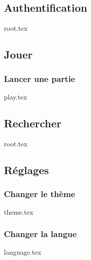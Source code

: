 \subsection{Authentification}
{root.tex}

\subsection{Jouer}
\subsubsection{Lancer une partie}
{play.tex}

\subsection{Rechercher}
{root.tex}

\subsection{Réglages}
\subsubsection{Changer le thème}
{theme.tex}

\subsubsection{Changer la langue}
{language.tex}